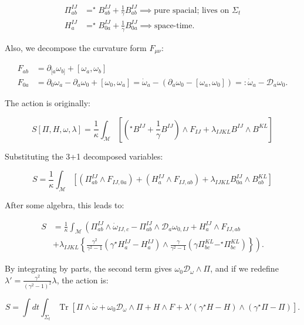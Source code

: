 \documentclass{article}
\begin{document}
$$
\begin{aligned}
\Pi_{ab}^{IJ} &= ^\star B_{ab}^{IJ} + \frac{1}{\gamma}B_{ab}^{IJ}\implies \text{pure spacial; lives on }\Sigma_t\\
H_a^{IJ} &= ^\star B_{0a}^{IJ} + \frac{1}{\gamma}B_{0a}^{IJ}\implies \text{space-time}.
\end{aligned}
$$

Also, we decompose the curvature form $F_{\mu\nu}$:

$$
\begin{aligned}
F_{ab} &= \partial_{[a}\omega_{b]} + [\omega_a, \omega_b]\\
F_{0a} &= \partial_0\omega_a - \partial_a\omega_0 + [\omega_0, \omega_a] = \dot{\omega}_a - (\partial_a\omega_0 - [\omega_a, \omega_0]) =: \dot{\omega}_a - \mathcal{D}_a\omega_0.
\end{aligned}
$$

The action is originally:

$$
S[\Pi, H, \omega, \lambda] = \frac{1}{\kappa}\int_\mathcal{M}\left[\left(^\star B^{IJ} + \frac{1}{\gamma}B^{IJ}\right)\wedge F_{IJ} + \lambda_{IJKL} B^{IJ}\wedge B^{KL}\right]
$$

Substituting the 3+1 decomposed variables:

$$
S = \frac{1}{\kappa}\int_\mathcal{M} \left[(\Pi_{ab}^{IJ}\wedge F_{IJ,0a}) + (H_{a}^{IJ}\wedge F_{IJ,ab}) + \lambda_{IJKL}B_{0a}^{IJ}\wedge B_{ab}^{KL}\right]
$$

After some algebra, this leads to:

$$
\begin{aligned}
S
&= \frac{1}{\kappa}\int_\mathcal{M}\left(\Pi_{ab}^{IJ}\wedge \dot{\omega}_{IJ,c} - \Pi_{ab}^{IJ}\wedge \mathcal{D}_a \omega_{0,IJ} + H_a^{IJ}\wedge F_{IJ,ab} \right. \\
&+  \left.\lambda_{IJKL}\left\{\frac{\gamma^2}{\gamma^2-1}(\gamma^\star H_{a}^{IJ} - H_{a}^{IJ}) \wedge \frac{\gamma}{\gamma^2-1}(\gamma\Pi_{bc}^{KL} - ^\star\Pi_{bc}^{KL})\right\}\right).
\end{aligned}
$$

By integrating by parts, the second term gives $\omega_0 \mathcal{D}_\omega\wedge \Pi$, and if we redefine $\lambda' = \frac{\gamma^2}{(\gamma^2-1)^2}\lambda$, the action is:

$$
S = \int dt \int_{\Sigma_t} \operatorname{Tr} \left[ \Pi \wedge \dot{\omega} + \omega_0 \mathcal{D}_\omega \wedge \Pi + H \wedge F + \lambda' (\gamma ^\star H - H) \wedge (\gamma ^\star \Pi - \Pi) \right].
$$
\end{document}
